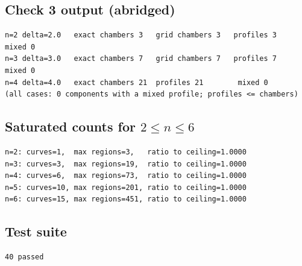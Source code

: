 ﻿\documentclass[11pt,a4paper]{article}
\theoremstyle{definition}
\theoremstyle{remark}
\begin{document}
\subsection{Check 3 output (abridged)}
\begin{verbatim}
n=2 delta=2.0   exact chambers 3   grid chambers 3   profiles 3   mixed 0
n=3 delta=3.0   exact chambers 7   grid chambers 7   profiles 7   mixed 0
n=4 delta=4.0   exact chambers 21  profiles 21        mixed 0
(all cases: 0 components with a mixed profile; profiles <= chambers)
\end{verbatim}

\subsection{Saturated counts for $2\le n\le6$}
\begin{verbatim}
n=2: curves=1,  max regions=3,   ratio to ceiling=1.0000
n=3: curves=3,  max regions=19,  ratio to ceiling=1.0000
n=4: curves=6,  max regions=73,  ratio to ceiling=1.0000
n=5: curves=10, max regions=201, ratio to ceiling=1.0000
n=6: curves=15, max regions=451, ratio to ceiling=1.0000
\end{verbatim}

\subsection{Test suite}
\begin{verbatim}
40 passed
\end{verbatim}
\end{document}
